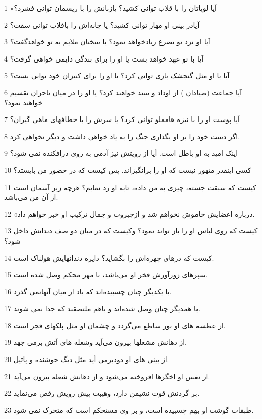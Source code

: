 \par 1 «آیا لویاتان را با قلاب توانی کشید؟ یازبانش را با ریسمان توانی فشرد؟
\par 2 آیادر بینی او مهار توانی کشید؟ یا چانه‌اش را باقلاب توانی سفت؟
\par 3 آیا او نزد تو تضرع زیادخواهد نمود؟ یا سخنان ملایم به تو خواهدگفت؟
\par 4 آیا با تو عهد خواهد بست یا او را برای بندگی دایمی خواهی گرفت؟
\par 5 آیا با او مثل گنجشک بازی توانی کرد؟ یا او را برای کنیزان خود توانی بست؟
\par 6 آیا جماعت (صیادان ) از اوداد و ستد خواهند کرد؟ یا او را در میان تاجران تقسیم خواهند نمود؟
\par 7 آیا پوست او را با نیزه هامملو توانی کرد؟ یا سرش را با خطافهای ماهی گیران؟
\par 8 اگر دست خود را بر او بگذاری جنگ را به یاد خواهی داشت و دیگر نخواهی کرد.
\par 9 اینک امید به او باطل است. آیا از رویتش نیز آدمی به روی درافکنده نمی شود؟
\par 10 کسی اینقدر متهور نیست که او را برانگیزاند. پس کیست که در حضور من بایستد؟
\par 11 کیست که سبقت جسته، چیزی به من داده، تابه او رد نمایم؟ هرچه زیر آسمان است از آن من می‌باشد.
\par 12 «درباره اعضایش خاموش نخواهم شد و ازجبروت و جمال ترکیب او خبر خواهم داد.
\par 13 کیست که روی لباس او را باز تواند نمود؟ وکیست که در میان دو صف دندانش داخل شود؟
\par 14 کیست که درهای چهره‌اش را بگشاید؟ دایره دندانهایش هولناک است.
\par 15 سپرهای زورآورش فخر او می‌باشد، با مهر محکم وصل شده است.
\par 16 با یکدیگر چنان چسبیده‌اند که باد از میان آنهانمی گذرد.
\par 17 با همدیگر چنان وصل شده‌اند و باهم ملتصقند که جدا نمی شوند.
\par 18 از عطسه های او نور ساطع می‌گردد و چشمان او مثل پلکهای فجر است.
\par 19 از دهانش مشعلها بیرون می‌آید وشعله های آتش برمی جهد.
\par 20 از بینی های او دودبرمی آید مثل دیگ جوشنده و پاتیل.
\par 21 از نفس او اخگرها افروخته می‌شود و از دهانش شعله بیرون می‌آید.
\par 22 بر گردنش قوت نشیمن دارد، وهیبت پیش رویش رقص می‌نماید.
\par 23 طبقات گوشت او بهم چسبیده است، و بر وی مستحکم است که متحرک نمی شود.
